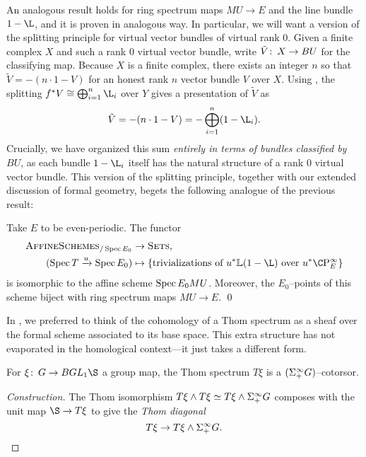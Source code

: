 An analogous result holds for ring spectrum maps \(MU \to E\) and the line bundle \(1 - \L\), and it is proven in analogous way.  In particular, we will want a version of the splitting principle for virtual vector bundles of virtual rank \(0\).  Given a finite complex \(X\) and such a rank \(0\) virtual vector bundle, write \(\tilde V \colon\thinspace X \to BU\) for the classifying map.  Because \(X\) is a finite complex, there exists an integer \(n\) so that \(\tilde V = -(n \cdot 1 - V)\) for an honest rank \(n\) vector bundle \(V\) over \(X\).  Using , the splitting \(f^* V \cong \bigoplus_{i=1}^n \L_i\) over \(Y\) gives a presentation of \(\tilde V\) as \[\tilde V = -(n \cdot 1 - V) = -\bigoplus_{i=1}^n (1 - \L_i).\]  Crucially, we have organized this sum \emph{entirely in terms of bundles classified by \(BU\)}, as each bundle \(1 - \L_i\) itself has the natural structure of a rank \(0\) virtual vector bundle.  This version of the splitting principle, together with our extended discussion of formal geometry, begets the following analogue of the previous result:
\begin{theorem}\label{BUTriumvirate}
Take \(E\) to be even-periodic.  The functor
\begin{align*}
\CatOf{AffineSchemes}_{/\Spec E_0} & \to \CatOf{Sets}, \\
(\Spec T \xrightarrow{u} \Spec E_0) & \mapsto \left\{ \text{trivializations of \(u^* \ThomSheaf{1 - \L}\) over \(u^* \CP^\infty_E\)} \right\}
\end{align*}
is isomorphic to the affine scheme \(\operatorname{Spec} E_0 MU\).  Moreover, the \(E_0\)--points of this scheme biject with ring spectrum maps \(MU \to E\). \qed
\end{theorem}

In , we preferred to think of the cohomology of a Thom spectrum as a sheaf over the formal scheme associated to its base space.  This extra structure has not evaporated in the homological context---it just takes a different form.
\begin{lemma}
For \(\xi\co G \to BGL_1 \S\) a group map, the Thom spectrum \(T\xi\) is a \((\Sigma^\infty_+ G)\)--cotorsor.
\end{lemma}
\begin{proof}[Construction]
The Thom isomorphism \(T\xi \wedge T\xi \simeq T\xi \wedge \Sigma^\infty_+ G\) composes with the unit map \(\S \to T\xi\) to give the \textit{Thom diagonal} \[T\xi \to T\xi \wedge \Sigma^\infty_+ G. \qedhere\]
\end{proof}

